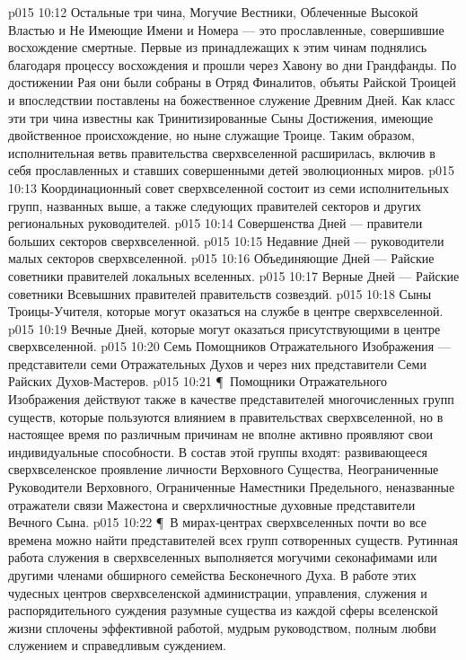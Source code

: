 \vs p015 10:12 Остальные три чина, Могучие Вестники, Облеченные Высокой Властью и Не Имеющие Имени и Номера --- это прославленные, совершившие восхождение смертные. Первые из принадлежащих к этим чинам поднялись благодаря процессу восхождения и прошли через Хавону во дни Грандфанды. По достижении Рая они были собраны в Отряд Финалитов, объяты Райской Троицей и впоследствии поставлены на божественное служение Древним Дней. Как класс эти три чина известны как Тринитизированные Сыны Достижения, имеющие двойственное происхождение, но ныне служащие Троице. Таким образом, исполнительная ветвь правительства сверхвселенной расширилась, включив в себя прославленных и ставших совершенными детей эволюционных миров.
\vs p015 10:13 Координационный совет сверхвселенной состоит из семи исполнительных групп, названных выше, а также следующих правителей секторов и других региональных руководителей.
\vs p015 10:14 \bibnobreakspace Совершенства Дней --- правители больших секторов сверхвселенной.
\vs p015 10:15 \bibnobreakspace Недавние Дней --- руководители малых секторов сверхвселенной.
\vs p015 10:16 \bibnobreakspace Объединяющие Дней --- Райские советники правителей локальных вселенных.
\vs p015 10:17 \bibnobreakspace Верные Дней --- Райские советники Всевышних правителей правительств созвездий.
\vs p015 10:18 \bibnobreakspace Сыны Троицы\hyp{}Учителя, которые могут оказаться на службе в центре сверхвселенной.
\vs p015 10:19 \bibnobreakspace Вечные Дней, которые могут оказаться присутствующими в центре сверхвселенной.
\vs p015 10:20 \bibnobreakspace Семь Помощников Отражательного Изображения --- представители семи Отражательных Духов и через них представители Семи Райских Духов\hyp{}Мастеров.
\vs p015 10:21 \P\ Помощники Отражательного Изображения действуют также в качестве представителей многочисленных групп существ, которые пользуются влиянием в правительствах сверхвселенной, но в настоящее время по различным причинам не вполне активно проявляют свои индивидуальные способности. В состав этой группы входят: развивающееся сверхвселенское проявление личности Верховного Существа, Неограниченные Руководители Верховного, Ограниченные Наместники Предельного, неназванные отражатели связи Мажестона и сверхличностные духовные представители Вечного Сына.
\vs p015 10:22 \P\ В мирах\hyp{}центрах сверхвселенных почти во все времена можно найти представителей всех групп сотворенных существ. Рутинная работа служения в сверхвселенных выполняется могучими секонафимами или другими членами обширного семейства Бесконечного Духа. В работе этих чудесных центров сверхвселенской администрации, управления, служения и распорядительного суждения разумные существа из каждой сферы вселенской жизни сплочены эффективной работой, мудрым руководством, полным любви служением и справедливым суждением.
